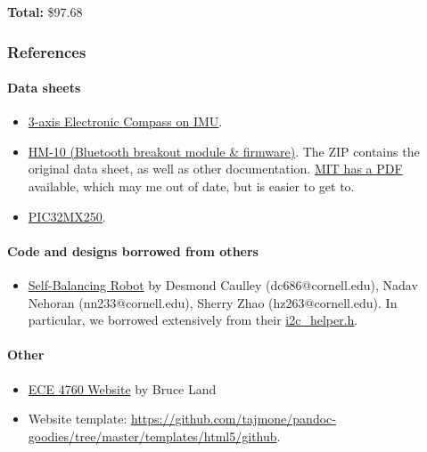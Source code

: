 \documentclass[]{article}
\providecommand{\tightlist}{%
  \setlength{\itemsep}{0pt}\setlength{\parskip}{0pt}}
\let\oldparagraph\paragraph
\renewcommand{\paragraph}[1]{\oldparagraph{#1}\mbox{}}
\begin{document}
\textbf{Total:} \$97.68

\hypertarget{references}{%
\subsubsection{References}\label{references}}

\hypertarget{data-sheets}{%
\paragraph{Data sheets}\label{data-sheets}}

\begin{itemize}
\tightlist
\item
  \href{https://www.akm.com/akm/en/file/datasheet/AK8963C.pdf}{3-axis
  Electronic Compass on IMU}.
\item
  \href{http://www.jnhuamao.cn/bluetooth40_en.zip}{HM-10 (Bluetooth
  breakout module \& firmware)}. The ZIP contains the original data
  sheet, as well as other documentation.
  \href{http://fab.cba.mit.edu/classes/863.15/doc/tutorials/programming/bluetooth/bluetooth40_en.pdf}{MIT
  has a PDF} available, which may me out of date, but is easier to get
  to.
\item
  \href{http://ww1.microchip.com/downloads/en/DeviceDoc/60001168J.pdf}{PIC32MX250}.
\end{itemize}

\hypertarget{code-and-designs-borrowed-from-others}{%
\paragraph{Code and designs borrowed from
others}\label{code-and-designs-borrowed-from-others}}

\begin{itemize}
\tightlist
\item
  \href{https://people.ece.cornell.edu/land/courses/ece4760/FinalProjects/f2015/dc686_nn233_hz263/final_project_webpage_v2/dc686_nn233_hz263/index.html}{Self-Balancing
  Robot} by Desmond Caulley (dc686@cornell.edu), Nadav Nehoran
  (nn233@cornell.edu), Sherry Zhao (hz263@cornell.edu). In particular,
  we borrowed extensively from their
  \href{https://people.ece.cornell.edu/land/courses/ece4760/FinalProjects/f2015/dc686_nn233_hz263/final_project_webpage_v2/dc686_nn233_hz263/dc686_nn233_hz263/i2c_helper.h}{i2c\_helper.h}.
\end{itemize}

\hypertarget{other}{%
\paragraph{Other}\label{other}}

\begin{itemize}
\tightlist
\item
  \href{http://people.ece.cornell.edu/land/courses/ece4760/}{ECE 4760
  Website} by Bruce Land
\item
  Website template:
  \url{https://github.com/tajmone/pandoc-goodies/tree/master/templates/html5/github}.
\end{itemize}

{}

\end{document}
